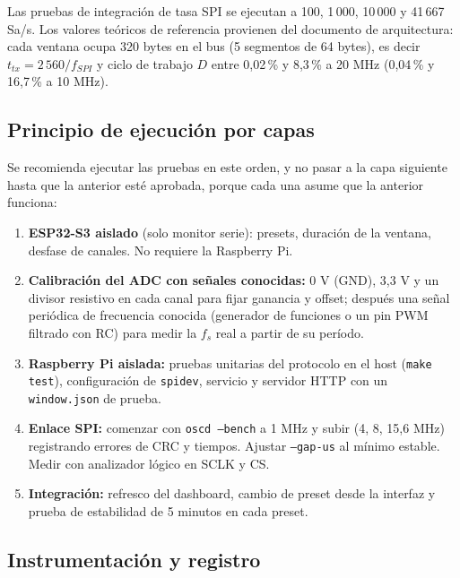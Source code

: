 \documentclass[12pt,a4paper]{article}
\begin{document}
Las pruebas de integración de tasa SPI se ejecutan a 100, 1\,000, 10\,000 y 41\,667 Sa/s. Los valores teóricos de referencia provienen del documento de arquitectura: cada ventana ocupa 320 bytes en el bus (5 segmentos de 64 bytes), es decir $t_{tx} = 2\,560 / f_{SPI}$ y ciclo de trabajo $D$ entre 0{,}02\,\% y 8{,}3\,\% a 20 MHz (0{,}04\,\% y 16{,}7\,\% a 10 MHz).

\subsection{Principio de ejecución por capas}

Se recomienda ejecutar las pruebas en este orden, y no pasar a la capa siguiente hasta que la anterior esté aprobada, porque cada una asume que la anterior funciona:

\begin{enumerate}
  \item \textbf{ESP32-S3 aislado} (solo monitor serie): presets, duración de la ventana, desfase de canales. No requiere la Raspberry Pi.
  \item \textbf{Calibración del ADC con señales conocidas:} 0 V (GND), 3{,}3 V y un divisor resistivo en cada canal para fijar ganancia y offset; después una señal periódica de frecuencia conocida (generador de funciones o un pin PWM filtrado con RC) para medir la $f_s$ real a partir de su período.
  \item \textbf{Raspberry Pi aislada:} pruebas unitarias del protocolo en el host (\texttt{make test}), configuración de \texttt{spidev}, servicio y servidor HTTP con un \texttt{window.json} de prueba.
  \item \textbf{Enlace SPI:} comenzar con \texttt{oscd --bench} a 1 MHz y subir (4, 8, 15{,}6 MHz) registrando errores de CRC y tiempos. Ajustar \texttt{--gap-us} al mínimo estable. Medir con analizador lógico en SCLK y CS.
  \item \textbf{Integración:} refresco del dashboard, cambio de preset desde la interfaz y prueba de estabilidad de 5 minutos en cada preset.
\end{enumerate}

\subsection{Instrumentación y registro}
\end{document}
